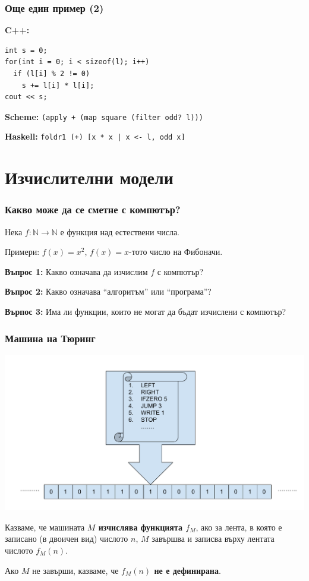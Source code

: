 \documentclass{beamer}
\begin{document}
\begin{frame}[fragile]
  \frametitle{Още един пример (2)}
  \textbf{C++:}
\begin{verbatim}
int s = 0;
for(int i = 0; i < sizeof(l); i++)
  if (l[i] % 2 != 0)
    s += l[i] * l[i];
cout << s;
\end{verbatim}
  
  \pause
  \textbf{Scheme:} \tt{(apply + (map square (filter odd? l)))}
  \vspace{1em}

  \pause
  \textbf{Haskell:} \tt{foldr1 (+) [x * x | x <- l, odd x]}
\end{frame}

\section*{Изчислителни модели}

\begin{frame}
  \frametitle{Какво може да се сметне с компютър?}
  
  Нека $f:\mathbb N\to\mathbb N$ е функция над естествени числа.

  Примери: $f(x) = x^2$, $f(x) = x$-тото число на Фибоначи.
  \vspace{2em}
  \pause

  \textbf{Въпрос 1:} Какво означава да изчислим $f$ с компютър?
  \vspace{2em}
  \pause

  \textbf{Въпрос 2:} Какво означава ``алгоритъм'' или ``програма''?
  \vspace{2em}

  \pause

  \textbf{Върпос 3:} Има ли функции, които не могат да бъдат изчислени с компютър?
\end{frame}

\begin{frame}
  \frametitle{Машина на Тюринг}

  \includegraphics[width=\textwidth]{turing.pdf}

  Казваме, че машината \textbf{$M$ изчислява функцията $f_M$}, ако за лента, в която е записано (в двоичен вид) числото $n$, $M$ завършва и записва върху лентата числото $f_M(n)$.

  Ако $M$ не завърши, казваме, че \textbf{$f_M(n)$ не е дефинирана}. 
\end{frame}
\end{document}
